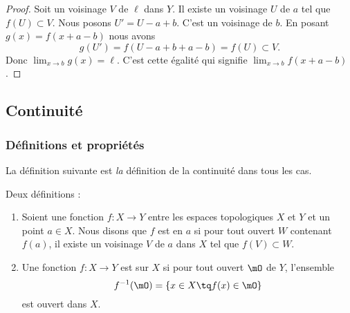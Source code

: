 \begin{proof}
    Soit un voisinage \( V\) de \( \ell\) dans \( Y\). Il existe un voisinage \( U\) de \( a\) tel que \( f(U)\subset V\). Nous posons \( U'=U-a+b\). C'est un voisinage de \( b\). En posant \( g(x)=f(x+a-b)\) nous avons
    \begin{equation}
        g(U')=f(U-a+b+a-b)=f(U)\subset V.
    \end{equation}
    Donc \( \lim_{x\to b}g(x)=\ell\). C'est cette égalité qui signifie \( \lim_{x\to b}f(x+a-b)\).
\end{proof}

\subsection{Continuité}

\subsubsection{Définitions et propriétés}

La définition suivante est \emph{la} définition de la continuité dans tous les cas.
\begin{definition}\label{DefOLNtrxB}
    Deux définitions :
    \begin{enumerate}
        \item   \label{ITEMooXARPooNzsWLr}
            Soient une fonction \( f\colon X\to Y\) entre les espaces topologiques \( X\) et \( Y\) et un point \( a\in X\). Nous disons que \( f\) est  en \( a\) si pour tout ouvert \( W\) contenant \( f(a)\), il existe un voisinage \( V\) de \( a\) dans \( X\) tel que \( f(V)\subset W\).
        \item       \label{ITEMooEHGWooDdITRV}
    Une fonction \( f\colon X\to Y\) est  sur \( X\) si pour tout ouvert \( \mO\) de \( Y\), l'ensemble
    \begin{equation}      \label{defFminus1ofaset}
      f^{-1}(\mO) = \{ x \in X \tq f(x) \in \mO\}
    \end{equation}
est ouvert dans \( X\).
    \end{enumerate}
\end{definition}


